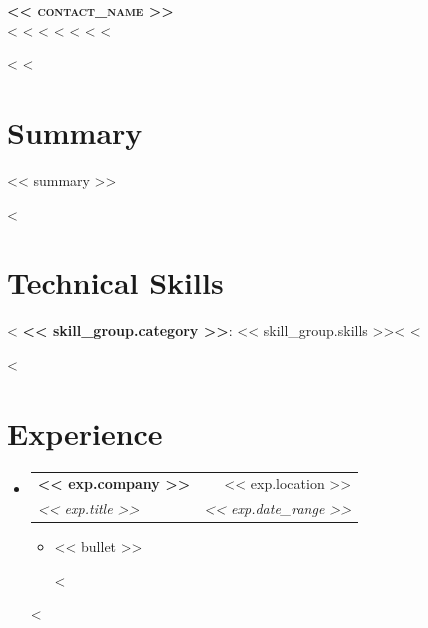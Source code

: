 \documentclass[letterpaper,11pt]{article}
\makeatletter
\newcommand{\resumeItem}[1]{
  \item\small{
    {#1 \vspace{-2pt}}
  }
}
\newcommand{\resumeSubheading}[4]{
  \vspace{-2pt}\item
    \begin{tabular*}{0.97\textwidth}[t]{l@{\extracolsep{\fill}}r}
      \textbf{#1} & #2 \\
      \textit{\small#3} & \textit{\small #4} \\
    \end{tabular*}\vspace{-7pt}
}
\newcommand{\resumeSubHeadingListStart}{\begin{itemize}[leftmargin=0.15in, label={}]}
\newcommand{\resumeSubHeadingListEnd}{\end{itemize}}
\newcommand{\resumeItemListStart}{\begin{itemize}}
\newcommand{\resumeItemListEnd}{\end{itemize}\vspace{-5pt}}
\makeatother
\begin{document}
\begin{center}
    \textbf{\Huge \scshape << contact_name >>} \\ \vspace{1pt}
    <%
    \small
    <%
    <%
    <%
    <%
    <%
    <%
\end{center}

<%
<%
\section{Summary}
\small{<< summary >>}
\vspace{-4pt}

<%
\section{Technical Skills}
 \begin{itemize}[leftmargin=0.15in, label={}]
    \small{\item{
      <%
      \textbf{<< skill_group.category >>}{: << skill_group.skills >>}<%
      <%
    }}
 \end{itemize}

<%
\section{Experience}
  \resumeSubHeadingListStart
    <%
    \resumeSubheading
      {<< exp.company >>}{<< exp.location >>}
      {<< exp.title >>}{<< exp.date_range >>}
      \resumeItemListStart
        <%
        \resumeItem{<< bullet >>}
        <%
      \resumeItemListEnd
    <%
  \resumeSubHeadingListEnd
\end{document}

